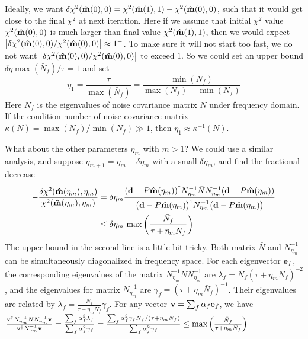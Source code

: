 \documentclass[11pt, letterpaper]{article}
\newcommand{\vbd}{\vb{d}}
\newcommand{\inv}[1]{#1^{-1}}
\newcommand{\hatm}{\vb{\hat{m}}}
\newcommand{\Nbar}{\bar{N}}
\begin{document}
Ideally, we want
$\delta \chi^2(\hatm(0),0) = \chi^2(\hatm(1), 1) - \chi^2(\hatm(0),0)$,
such that it would get close to the final $\chi^2$ at next iteration.
Here if we assume that initial $\chi^2$ value $\chi^2(\hatm(0),0)$ is much
larger than final value $\chi^2(\hatm(1),1)$,
then we would expect
$\qty|\delta\chi^2(\hatm(0),0)/\chi^2(\hatm(0),0)| \approx 1^-$.
To make sure it will not start too fast, we do not want 
$\qty|\delta\chi^2(\hatm(0),0)/\chi^2(\hatm(0),0)|$ 
to exceed $1$.
So we could set an upper bound $\delta \eta \max(\Nbar_f) / \tau = 1$
and set
\begin{equation}
\eta_1 = \frac{\tau}{\max(\Nbar_f)} = \frac{\min(N_f)}{\max(N_f) - \min(N_f)}
\end{equation}
Here $N_f$ is the eigenvalues of noise covariance matrix $N$ under frequency
domain.
If the condition number of noise covariance matrix
$\kappa(N) = \max(N_f)/\min(N_f) \gg 1$,
then $\eta_1 \approx \inv{\kappa} (N)$.

What about the other parameters $\eta_m$ with $m > 1$?
We could use a similar analysis,
and suppose $\eta_{m+1} = \eta_m + \delta \eta_m$ with a small $\delta\eta_m$,
and find the fractional decrease
\begin{align}
\begin{aligned}[b]
-\frac{\delta \chi^2(\hatm(\eta_m), \eta_m)}{\chi^2(\hatm(\eta_m), \eta_m)}  
&= \delta\eta_m
\frac{\qty(\vbd - P\hatm(\eta_m))^{\dagger}
    \inv{N_{\eta_m}} \Nbar \inv{N_{\eta_m}}
    (\vbd - P\hatm(\eta_m))
}
{\qty\big(\vbd - P \hatm(\eta_m))^{\dagger}
    \inv{N_{\eta_m}}
    \qty\big(\vbd - P\hatm(\eta_m))
}
\\
& \leq \delta \eta_m\, \max\qty(\frac{\Nbar_f}{\tau + \eta_m \Nbar_f})
\label{eta upper bound}
\end{aligned}
\end{align}
The upper bound in the second line is a little bit tricky.
Both matrix $\Nbar$ and $\inv{N}_{\eta_m}$ 
can be simultaneously diagonalized in frequency space.
For each eigenvector $\vb{e}_f$,
the corresponding eigenvalues of the matrix 
$\inv{N}_{\eta_m} \Nbar \inv{N}_{\eta_m}$
are
$\lambda_f = \Nbar_f (\tau + \eta_m \Nbar_f)^{-2}$,
and the eigenvalues for matrix 
$\inv{N}_{\eta_m}$
are
$\gamma_f = (\tau + \eta_m \Nbar_f)^{-1}$.
Their eigenvalues are related by
$\lambda_f = \frac{\Nbar_f}{\tau + \eta_m \Nbar_f} \gamma_f$.
For any vector $\vb{v} = \sum_f \alpha_f \vb{e}_f$, we have
$\frac{\vb{v}^{\dagger} \inv{N}_{\eta_m} \Nbar \inv{N}_{\eta_m} \vb{v}}
{\vb{v}^{\dagger} \inv{N}_{\eta_m} \vb{v}}
= \frac{\sum_f \alpha_f^2 \lambda_f}{\sum_f \alpha_f^2 \gamma_f}
= \frac{\sum_f \alpha_f^2 \gamma_f \Nbar_f/(\tau + \eta_m \Nbar_f)}
{\sum_f \alpha_f^2 \gamma_f}
\leq \max \qty( \frac{\Nbar_f}{\tau + \eta_m \Nbar_f})
$
\end{document}
